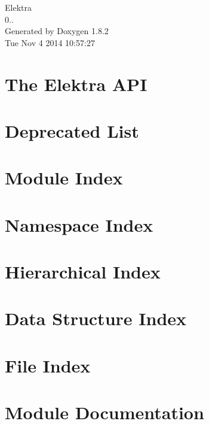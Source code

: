 \documentclass{book}
\begin{document}
\hypersetup{pageanchor=false,citecolor=blue}
\begin{titlepage}
\vspace*{7cm}
\begin{center}
{\Large Elektra \\[1ex]\large 0.. }\\
\vspace*{1cm}
{\large Generated by Doxygen 1.8.2}\\
\vspace*{0.5cm}
{\small Tue Nov 4 2014 10:57:27}\\
\end{center}
\end{titlepage}
\clearemptydoublepage
{}
\tableofcontents
\clearemptydoublepage
{}
\hypersetup{pageanchor=true,citecolor=blue}
\chapter{The Elektra A\-P\-I}
\label{index}\hypertarget{index}{}
\chapter{Deprecated List}
\label{deprecated}
\hypertarget{deprecated}{}

\chapter{Module Index}

\chapter{Namespace Index}

\chapter{Hierarchical Index}

\chapter{Data Structure Index}

\chapter{File Index}

\chapter{Module Documentation}








\end{document}
